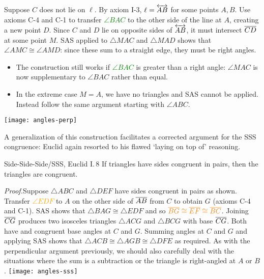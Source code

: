 \begin{minipage}[t]{0.7\linewidth}\vspace{0pt}

Suppose $C$ does not lie on $\ell$. By axiom I-3, $\ell=\overleftrightarrow{AB}$ for some points $A,B$.\smallbreak
Use axioms C-4 and C-1 to transfer \textcolor{Green}{$\angle BAC$} to the other side of the line at $A$, creating a new point $D$.\smallbreak
Since $C$ and $D$ lie on opposite sides of $\overleftrightarrow{AB}$, it must intersect $\overline{CD}$ at some point $M$.\smallbreak
SAS applied to $\triangle MAC$ and $\triangle MAD$ shows that $\angle AMC\cong\angle AMD$: since these sum to a straight edge, they must be right angles.
\begin{itemize}\itemsep0pt
  \item The construction still works if \textcolor{Green}{$\angle BAC$} is greater than a right angle: $\angle MAC$ is now supplementary to $\angle BAC$ rather than equal.
  \item In the extreme case $M=A$, we have no triangles and SAS cannot be applied. Instead follow the same argument starting with $\angle ABC$.
\end{itemize}
\end{minipage}\begin{minipage}[t]{0.3\linewidth}\vspace{0pt}
\flushright\texttt{[image: angles-perp]}
\end{minipage}\bigbreak

A generalization of this construction facilitates a corrected argument for the SSS congruence: Euclid again resorted to his flawed `laying on top of' reasoning.

\begin{thm}{Side-Side-Side/SSS, Euclid I.\,8}{}
If triangles have sides congruent in pairs, then the triangles are congruent.
\end{thm}


\begin{tcolorbox}[proofstyle, lower separated=false, sidebyside, sidebyside align=top seam, sidebyside gap=0pt, righthand width=0.4\linewidth]
\emph{Proof.}\lstsp Suppose $\triangle ABC$ and $\triangle DEF$ have sides congruent in pairs as shown.\smallbreak
Transfer \textcolor{orange}{$\angle EDF$} to $A$ on the other side of $\overline{AB}$ from $C$ to obtain $G$ (axioms C-4 and C-1).\smallbreak
SAS shows that $\triangle BAG\cong\triangle EDF$ and so $\textcolor{orange}{\overline{BG}\cong\overline{EF}\cong\overline{BC}}$.\smallbreak
Joining $\overline{CG}$ produces two isosceles triangles $\triangle ACG$ and $\triangle BCG$ with base $\overline{CG}$. Both have and congruent base angles at $C$ and $G$.\smallbreak
Summing angles at $C$ and $G$ and applying SAS shows that $\triangle ACB\cong\triangle AGB\cong\triangle DFE$ as required.\medbreak
As with the perpendicular argument previously, we should also carefully deal with the situations where the sum is a subtraction or the triangle is right-angled at $A$ or $B$.
\tcblower
\flushright\texttt{[image: angles-sss]}\\[-10pt]\hfill\qedsymbol
\end{tcolorbox}


